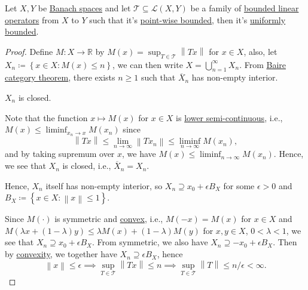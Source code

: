 \begin{theorem}\label{thm:uniform-boundedness}
	Let \(X, Y\) be \hyperref[def:Banach-space]{Banach spaces} and let \(\mathcal{T} \subseteq \mathcal{L} (X, Y)\) be a family of \hyperref[def:bounded-linear-op]{bounded linear operators} from \(X\) to \(Y\) such that it's \hyperref[def:point-wise-bounded]{point-wise bounded}, then it's \hyperref[def:uniformly-bounded]{uniformly bounded}.
\end{theorem}
\begin{proof}
	Define \(M\colon X\to \mathbb{R} \) by \(M(x) = \sup _{T\in \mathcal{T} }\left\lVert Tx\right\rVert \) for \(x\in X\), also, let \(X_n \coloneqq \left\{ x\in X\colon M(x) \leq n \right\}\), we can then write \(X = \bigcup_{n=1}^{\infty} X_n\). From \hyperref[prop:Baire-category]{Baire category theorem}, there exists \(n \geq 1\) such that \(\overline{X} _n\) has non-empty interior.
	\begin{claim}
		\(X_n\) is closed.
	\end{claim}
	\begin{explanation}
		Note that the function \(x \mapsto M(x)\) for \(x\in X\) is \hyperref[def:lower-semi-continuous]{lower semi-continuous}, i.e., \(M(x) \leq \liminf_{x_n \to x} M(x_n)\) since
		\[
			\left\lVert Tx\right\rVert \leq \lim\limits_{n \to \infty} \left\lVert Tx_n\right\rVert \leq \liminf_{n \to \infty} M(x_n),
		\]
		and by taking supremum over \(x\), we have \(M(x) \leq \liminf_{n \to \infty} M(x_n)\). Hence, we see that \(X_n\) is closed, i.e., \(\overline{X} _n = X_n\).
	\end{explanation}

	Hence, \(X_n\) itself has non-empty interior, so \(X_n \supseteq x_{0} + \epsilon B_X\) for some \(\epsilon > 0\) and \(B_X\coloneqq \left\{ x\in X\colon \left\lVert x\right\rVert \leq 1 \right\} \).

	Since \(M(\cdot)\) is symmetric and \hyperref[def:convex-function]{convex}, i.e., \(M(-x) = M(x)\) for \(x\in X\) and \(M(\lambda x + (1 - \lambda )y) \leq \lambda M(x) + (1 - \lambda )M(y)\) for \(x, y\in X\), \(0 < \lambda < 1\), we see that \(X_n \supseteq x_0 + \epsilon B_X\). From symmetric, we also have \(X_n \supseteq -x_0 + \epsilon B_X\). Then by \hyperref[def:convex-function]{convexity}, we together have \(X_n \supseteq \epsilon B_X\), hence
	\[
		\left\lVert x\right\rVert \leq \epsilon \implies \sup _{T\in \mathcal{T} } \left\lVert Tx\right\rVert \leq n\implies \sup _{T\in \mathcal{T} } \left\lVert T\right\rVert \leq n / \epsilon  < \infty.
	\]
\end{proof}

